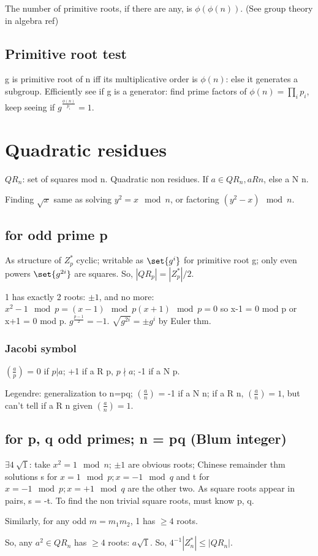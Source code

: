 \documentclass[10pt]{amsart}
\begin{document}
The number of primitive roots, if there are any, is $\phi(\phi(n))$. (See group theory in algebra ref)

\subsection{Primitive root test}
g is primitive root of n iff its multiplicative order is $\phi(n)$: else it generates a subgroup. Efficiently see if g is a generator: find prime factors of $\phi(n) = \prod_{i} p_{i}$, keep seeing if $g^{\frac{\phi(n)}{p_{i}}} = 1$.

\section{Quadratic residues}
$QR_{n}$: set of squares mod n. Quadratic non residues. If $a \in QR_{n}, a R n$, else a N n.

Finding $\sqrt{x}$ same as solving $y^{2} = x \mod n$, or factoring $(y^{2}-x) \mod n$.

\subsection{ for odd prime p}
As structure of $Z_{p}^{*}$ cyclic; writable as $\set{g^{i}}$ for primitive root g; only even powers $\set{g^{2i}}$ are squares. So, $|QR_{p}| = |Z_{p}^{*}|/2$.

1 has exactly 2 roots: $\pm 1$, and no more: $x^{2} - 1 \mod p = (x-1) \mod p (x+1) \mod p = 0$ so x-1 = 0 mod p or x+1 = 0 mod p. $g^{\frac{p-1}{2}} = -1$. $\sqrt{g^{2i}} = \pm g^{i}$ by Euler thm.

\subsubsection{Jacobi symbol}
$(\frac{a}{p})$ = 0 if $p|a$; +1 if a R p, $p\nmid a$; -1 if a N p.

Legendre: generalization to n=pq; $(\frac{a}{n})$ = -1 if a N n; if a R n, $(\frac{a}{n}) = 1$, but can't tell if a R n given $(\frac{a}{n}) = 1$.

\subsection{ for p, q odd primes; n = pq (Blum integer)}
$\exists 4\ \sqrt{1}$: take $x^{2} = 1 \mod n$; $\pm 1$ are obvious roots; Chinese remainder thm solutions s for $x = 1 \mod p; x = -1 \mod q$ and t for $x = -1 \mod p; x = +1 \mod q$ are the other two. As square roots appear in pairs, s = -t. To find the non trivial square roots, must know p, q.

Similarly, for any odd $m = m_{1}m_{2}$, 1 has $\geq 4$ roots.

So, any $a^{2} \in QR_{n}$ has $\geq 4$ roots: $a\sqrt{1}$. So, $4^{-1} |Z_{n}^{*}| \leq |QR_{n}|$.

%
%
\end{document}

